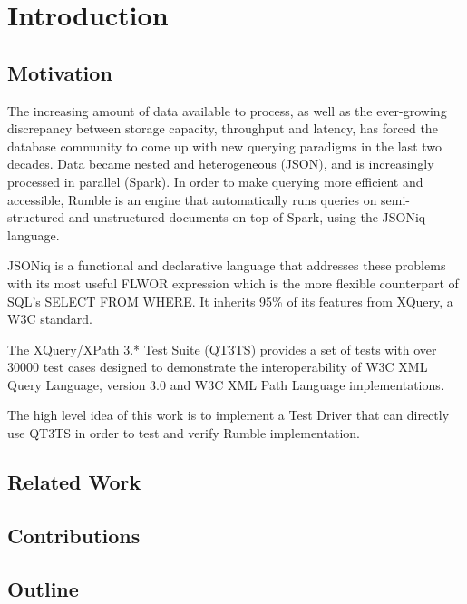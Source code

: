 
\chapter{Introduction}

\section{Motivation}

The increasing amount of data available to process, as well as the ever-growing discrepancy between storage capacity, throughput and latency, has forced the database community to come up with new querying paradigms in the last two decades. Data became nested and heterogeneous (JSON), and is increasingly processed in parallel (Spark). In order to make querying more efficient and accessible, Rumble \cite{muller2020rumble} is an engine that automatically runs queries on semi-structured and unstructured documents on top of Spark, using the JSONiq language. 

JSONiq \cite{JSONIQ}is a functional and declarative language that addresses these problems with its most useful FLWOR expression which is the more flexible counterpart of SQL’s SELECT FROM WHERE. It inherits 95\% of its features from XQuery, a W3C standard.

The XQuery/XPath 3.* Test Suite (QT3TS) \cite{TestSuite} provides a set of tests with over 30000 test cases designed to demonstrate the interoperability of W3C XML Query Language, version 3.0 and W3C XML Path Language implementations.

The high level idea of this work is to implement a Test Driver that can directly use QT3TS in order to test and verify Rumble implementation.

\section{Related Work}

\section{Contributions}



\section{Outline}
